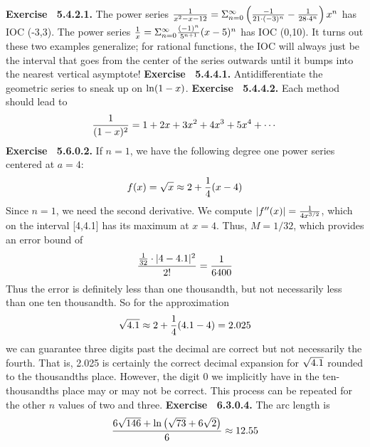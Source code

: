  {\noindent \protect \bf  Exercise ~5.4.2.1.} The power series $\protect \frac  {1}{x^2-x-12}=\Sigma _{n=0}^\infty \left (\protect \frac  {-1}{21\cdot (-3)^n}-\protect \frac  {1}{28\cdot 4^n}\right )x^n$ has IOC (-3,3). The power series $\protect \frac  {1}{x}=\Sigma _{n=0}^\infty \protect \frac  {(-1)^n}{5^{n+1}}(x-5)^n$ has IOC (0,10). It turns out these two examples generalize; for rational functions, the IOC will always just be the interval that goes from the center of the series outwards until it bumps into the nearest vertical asymptote! \protect \newline  \protect \newline  
 {\noindent \protect \bf  Exercise ~5.4.4.1.} Antidifferentiate the geometric series to sneak up on $\protect \qopname  \relax o{ln}(1-x)$. \protect \newline  \protect \newline  
 {\noindent \protect \bf  Exercise ~5.4.4.2.} Each method should lead to $$\protect \frac  {1}{(1-x)^2}=1+2x+3x^2+4x^3+5x^4+\protect \cdots  $$ \protect \newline  \protect \newline  
 {\noindent \protect \bf  Exercise ~5.6.0.2.} If $n=1$, we have the following degree one power series centered at $a=4$: $$f(x)=\protect \sqrt  {x}\approx 2+\protect \frac  {1}{4}(x-4)$$ Since $n=1$, we need the second derivative. We compute $\left |f''(x)\right |=\protect \frac  {1}{4x^{3/2}}$, which on the interval [4,4.1] has its maximum at $x=4$. Thus, $M=1/32$, which provides an error bound of $$\protect \frac  {\protect \frac  {1}{32}\cdot |4-4.1|^2}{2!}=\protect \frac  {1}{6400}$$ Thus the error is definitely less than one thousandth, but not necessarily less than one ten thousandth. So for the approximation $$\protect \sqrt  {4.1}\approx 2+\protect \frac  {1}{4}(4.1-4)=2.025$$ we can guarantee three digits past the decimal are correct but not necessarily the fourth. That is, 2.025 is certainly the correct decimal expansion for $\protect \sqrt  {4.1}$ rounded to the thousandths place. However, the digit 0 we implicitly have in the ten-thousandths place may or may not be correct. This process can be repeated for the other $n$ values of two and three. \protect \newline  \protect \newline  
 {\noindent \protect \bf  Exercise ~6.3.0.4.} The arc length is $$\protect \frac  {6\protect \sqrt  {146}+\protect \qopname  \relax o{ln}\left (\protect \sqrt  {73}+6\protect \sqrt  {2}\right )}{6}\approx 12.55$$ \protect \newline  \protect \newline  
